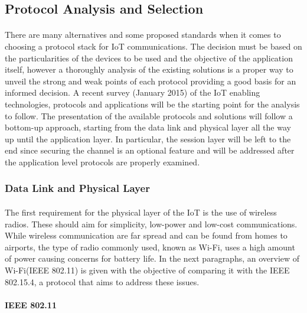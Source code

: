\subsection{Protocol Analysis and Selection}
\label{sec:protocol_analysis}

\paragraph{}
There are many alternatives and some proposed standards when it comes to choosing a protocol stack for \ac{IoT} communications. The decision must be based on the particularities of the devices to be used and the objective of the application itself, however a thoroughly analysis of the existing solutions is a proper way to unveil the strong and weak points of each protocol providing a good basis for an informed decision. A recent survey (January 2015) \cite{Al-Fuqaha2015} of the \ac{IoT} enabling technologies, protocols and applications will be the starting point for the analysis to follow. The presentation of the available protocols and solutions will follow a bottom-up approach, starting from the data link and physical layer all the way up until the application layer. In particular, the session layer will be left to the end since securing the channel is an optional feature and will be addressed after the application level protocols are properly examined.

\subsubsection{Data Link and Physical Layer}

\paragraph{}
The first requirement for the physical layer of the \ac{IoT} is the use of wireless radios. These should aim for simplicity, low-power and low-cost communications. While wireless communication are far spread and can be found from homes to airports, the type of radio commonly used, known as Wi-Fi, uses a high amount of power causing concerns for battery life. In the next paragraphs, an overview of Wi-Fi(IEEE 802.11) is given with the objective of comparing it with the IEEE 802.15.4, a protocol that aims to address these issues.

\paragraph{\textbf{IEEE 802.11}}
